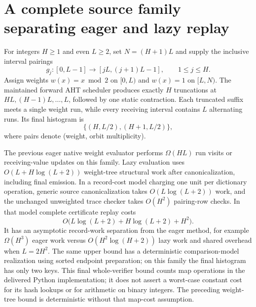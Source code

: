 \section{A complete source family separating eager and lazy replay}
\label{sec:separation}


\begin{theorem}
\label{thm:star}
For integers $H\ge1$ and even $L\ge2$, set $N=(H+1)L$ and supply the inclusive
interval pairings
\[
 g_j:[0,L-1]\longrightarrow[jL,(j+1)L-1],\qquad 1\le j\le H.
\]
Assign weights $w(x)=x\bmod2$ on $[0,L)$ and $w(x)=1$ on $[L,N)$.
The maintained forward AHT scheduler produces exactly $H$ truncations at
$HL,(H-1)L,\ldots,L$, followed by one static contraction. Each truncated
suffix meets a single weight run, while every receiving interval contains
$L$ alternating runs. Its final histogram is
\[
 \{(H,L/2),(H+1,L/2)\},
\]
where pairs denote (weight, orbit multiplicity).

The previous eager native weight evaluator performs $\Omega(HL)$ run visits
or receiving-value updates on this family. Lazy evaluation uses
$O(L+H\log(L+2))$ weight-tree structural work after canonicalization, including
final emission. In a record-cost model charging one unit per dictionary
operation, generic source canonicalization takes $O(L\log(L+2))$ work,
and the unchanged unweighted trace checker takes $O(H^2)$ pairing-row
checks. In that model complete certificate replay costs
\[
 O\bigl(L\log(L+2)+H\log(L+2)+H^2\bigr).
\]
It has an asymptotic record-work separation from the eager method, for
example $\Omega(H^3)$ eager work versus $O(H^2\log(H+2))$ lazy work and
shared overhead when $L=2H^2$. The same upper bound has a deterministic
comparison-model realization using sorted endpoint preparation; on this
family the final histogram has only two keys. This final whole-verifier
bound counts map operations in the delivered Python implementation;
it does not assert a worst-case constant cost for its hash lookups or
for arithmetic on binary integers. The preceding weight-tree bound is
deterministic without that map-cost assumption.
\end{theorem}
